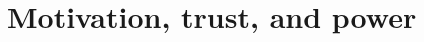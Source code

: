 \documentclass[12pt,twoside]{report}
\begin{document}
\chapter{Motivation, trust, and power}

%
%
%
%
%
%
%
%
%
%
%
%
%
%
%


\pagebreak





%
%
%
%
%
%
%
%
%
\end{document}
